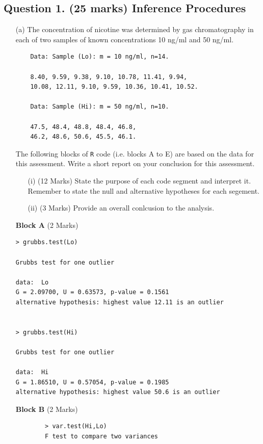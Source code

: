 \documentclass[a4paper,12pt]{article}
\begin{document}
\subsection*{Question 1. (25 marks) Inference Procedures}\label{sec:question-1.-(25-marks)-inference-procedures-and-distributional-testing}
	
\begin{itemize}
	\item[(a)]
 The concentration of nicotine was determined by gas chromatography in each of two samples of known concentrations 10 ng/ml and 50 ng/ml.
\begin{framed}
	\begin{verbatim}
	Data: Sample (Lo): m = 10 ng/ml, n=14.
	
	8.40, 9.59, 9.38, 9.10, 10.78, 11.41, 9.94, 
	10.08, 12.11, 9.10, 9.59, 10.36, 10.41, 10.52.
	
	Data: Sample (Hi): m = 50 ng/ml, n=10.
	
	47.5, 48.4, 48.8, 48.4, 46.8, 
	46.2, 48.6, 50.6, 45.5, 46.1.
	\end{verbatim}
\end{framed}


\noindent The following blocks of \texttt{R} code (i.e. blocks A to E) are based on the data for this assessment. Write a short report on your conclusion for this assessment. 

\begin{itemize}
	\item[(i)] (12 Marks) State the purpose of each code segment and interpret it. Remember to state the null and alternative hypotheses for each segement.
	\item[(ii)] (3 Marks) Provide an overall conlcusion to the analysis.
\end{itemize}




\noindent \textbf{Block A} (2 Marks)
\begin{framed}
\begin{verbatim}
> grubbs.test(Lo)

Grubbs test for one outlier

data:  Lo
G = 2.09700, U = 0.63573, p-value = 0.1561
alternative hypothesis: highest value 12.11 is an outlier


> grubbs.test(Hi)

Grubbs test for one outlier

data:  Hi
G = 1.86510, U = 0.57054, p-value = 0.1985
alternative hypothesis: highest value 50.6 is an outlier
\end{verbatim}
\end{framed}	
\newpage
\noindent \textbf{Block B} (2 Marks)
	\begin{framed}
		\begin{verbatim}
		> var.test(Hi,Lo)
		F test to compare two variances
		

\end{verbatim}
\end{framed}
\end{itemize}
\end{document}
